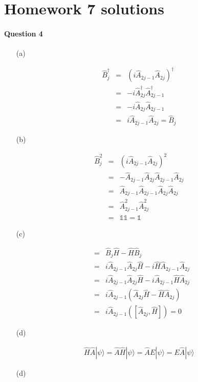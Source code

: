 \documentclass[11pt,a4paper]{article}
\author{Zehao Gao}
\newcommand{\ket}{\rangle}
\begin{document}
\section*{Homework 7 solutions}

\paragraph*{Question 4}

\begin{enumerate}

\item[(a)]

    \begin{eqnarray}
        \hat{B}_j^\dag&=&(i\hat{A}_{2j-1}\hat{A}_{2j})^\dag \\
        &=&-i\hat{A}_{2j}^\dag\hat{A}_{2j-1}^\dag \\
        &=&-i\hat{A}_{2j}\hat{A}_{2j-1} \\
        &=&i\hat{A}_{2j-1}\hat{A}_{2j}=\hat{B}_j
    \end{eqnarray}
    
\item[(b)]

    \begin{eqnarray}
        \hat{B}_j^2&=&(i\hat{A}_{2j-1}\hat{A}_{2j})^2 \\
        &=&-\hat{A}_{2j-1}\hat{A}_{2j}\hat{A}_{2j-1}\hat{A}_{2j} \\
        &=&\hat{A}_{2j-1}\hat{A}_{2j-1}\hat{A}_{2j}\hat{A}_{2j} \\
        &=&\hat{A}_{2j-1}^2\hat{A}_{2j}^2 \\
        &=&\mathbb{1}\mathbb{1}=\mathbb{1}
    \end{eqnarray}
    
\item[(c)]

    \begin{eqnarray}
        [\hat{B}_j,\hat{H}]&=&\hat{B}_j\hat{H}-\hat{H}\hat{B}_j \\
        &=&i\hat{A}_{2j-1}\hat{A}_{2j}\hat{H}-i\hat{H}\hat{A}_{2j-1}\hat{A}_{2j}\\
        &=&i\hat{A}_{2j-1}\hat{A}_{2j}\hat{H}-i\hat{A}_{2j-1}\hat{H}\hat{A}_{2j}\\
        &=&i\hat{A}_{2j-1}(\hat{A}_{2j}\hat{H}-\hat{H}\hat{A}_{2j})\\
        &=&i\hat{A}_{2j-1}([\hat{A}_{2j},\hat{H}])=0
    \end{eqnarray}

\item[(d)]

    \begin{eqnarray}
        \hat{H}\hat{A}|\psi\ket=\hat{A}\hat{H}|\psi\ket=\hat{A}E|\psi\ket=E\hat{A}|\psi\ket
    \end{eqnarray}

\item[(d)]

    

\end{enumerate}
\end{document}
